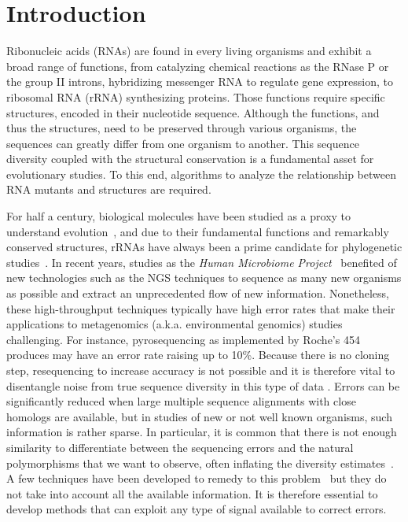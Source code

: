 \section{Introduction}
\label{sec:introduction}

Ribonucleic acids (RNAs) are found in every living organisms and exhibit a broad range of functions, from catalyzing
chemical reactions as the RNase P or the group II introns, hybridizing  messenger RNA to regulate gene expression,
to ribosomal RNA (rRNA) synthesizing proteins. Those functions  require specific structures,  encoded in their nucleotide
sequence. Although the functions, and thus the structures, need to be preserved through various organisms, the sequences
can greatly differ from one organism to another. This sequence diversity coupled with the structural conservation is a fundamental
asset for evolutionary studies. To this end, algorithms to analyze the relationship between RNA mutants and structures are required.

For half a century, biological molecules have been studied as a proxy to understand evolution~\cite{Zuckerkandl1965}, and due
to their fundamental functions and remarkably conserved structures, rRNAs have always been a prime candidate for phylogenetic
studies~\cite{Olsen1986, Olsen1993}. In recent years, studies as the \emph{Human Microbiome Project}~\cite{Turnbaugh2007} benefited
of new technologies such as the NGS techniques to sequence as many new organisms as possible and extract an unprecedented flow of new information. 
Nonetheless, these high-throughput techniques typically have high error rates that make their applications to metagenomics (a.k.a. environmental
genomics) studies challenging. For instance, pyrosequencing as implemented by Roche's 454 produces may have an error rate raising up to 10\%.
Because there is no cloning step, resequencing to increase accuracy is not possible and it is therefore vital to disentangle noise from true sequence
diversity in this type of data \cite{Quince:2009uq}. Errors can be significantly reduced  when large multiple sequence alignments with close homologs
are available, but in studies of new or not well known organisms, such information is rather sparse. In particular, it is common that there is not enough  similarity to 
differentiate between the sequencing errors and the natural polymorphisms that we want to observe, often inflating the diversity estimates~\cite{Kunin2010}.
A few techniques have been developed to remedy to this problem~\cite{Quinlan2008,Medvedev2011} but they do not take
into account all the available information. It is therefore essential to develop methods that can exploit any type of signal available to correct errors.  

